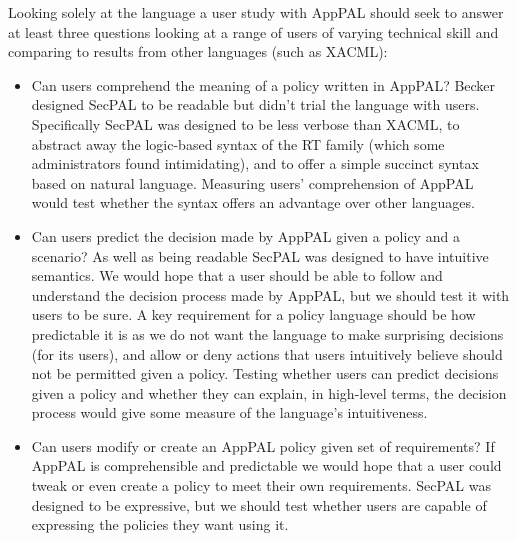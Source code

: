 \documentclass[thesis.tex]{subfiles}
\begin{document}
Looking solely at the language a user study with AppPAL should seek to answer at
least three questions looking at a range of users of varying technical skill and
comparing to results from other languages (such as XACML):

\begin{itemize}
\item Can users comprehend the meaning of a policy written in AppPAL? Becker
  designed SecPAL to be readable but didn't trial the language with users.
  Specifically SecPAL was designed to be less verbose than XACML, to abstract away
  the logic-based syntax of the RT family (which some administrators found
  intimidating), and to offer a simple succinct syntax based on natural language.
  Measuring users' comprehension of AppPAL would test whether the syntax offers an
  advantage over other languages.

\item Can users predict the decision made by AppPAL given a policy and
a scenario? As well as being readable SecPAL was designed to have
intuitive semantics. We would hope that a user should be able to
follow and understand the decision process made by AppPAL, but we
should test it with users to be sure. A key requirement for a policy
language should be how predictable it is as we do not want the language
to make surprising decisions (for its users), and allow or deny
actions that users intuitively believe should not be permitted given a
policy. Testing whether users can predict decisions given a policy and
whether they can explain, in high-level terms, the decision process
would give some measure of the language's intuitiveness.
  
\item Can users modify or create an AppPAL policy given set of requirements? If
  AppPAL is comprehensible and predictable we would hope that a user could tweak
  or even create a policy to meet their own requirements. SecPAL was designed to
  be expressive, but we should test whether users are capable of expressing the
  policies they want using it.
\end{itemize}
\end{document}
